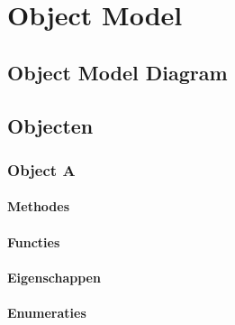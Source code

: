 \section{Object Model}
\subsection{Object Model Diagram}
\subsection{Objecten}
\subsubsection{Object A}
\paragraph{Methodes}
\paragraph{Functies}
\paragraph{Eigenschappen}
\paragraph{Enumeraties}
